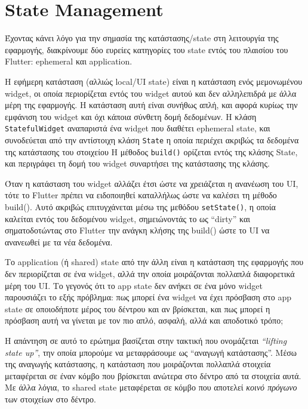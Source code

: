 \documentclass[../thesis.tex]{subfiles}
\begin{document}
\section{State Management}
Έχοντας κάνει λόγο για την σημασία της κατάστασης/state στη λειτουργία της εφαρμογής, διακρίνουμε δύο ευρείες κατηγορίες του state εντός του πλαισίου του Flutter: ephemeral και application\cite{flutter_state}.

Η εφήμερη κατάσταση (αλλιώς local/UI state) είναι η κατάσταση ενός μεμονωμένου widget, οι οποία περιορίζεται εντός του widget αυτού και δεν αλληλεπιδρά με άλλα μέρη της εφαρμογής.
Η κατάσταση αυτή είναι συνήθως απλή, και αφορά κυρίως την εμφάνιση του widget και όχι κάποια σύνθετη δομή δεδομένων.
Η κλάση \texttt{StatefulWidget} αναπαριστά ένα widget που διαθέτει ephemeral state, και συνοδεύεται από την αντίστοιχη κλάση \texttt{State} η οποία περιέχει ακριβώς τα δεδομένα της κατάστασης του στοιχείου
Η μέθοδος \texttt{build()} ορίζεται εντός της κλάσης State, και περιγράφει τη δομή του widget συναρτήσει της κατάστασης της κλάσης.

Όταν η κατάσταση του widget αλλάζει έτσι ώστε να χρειάζεται η ανανέωση του UI, τότε το Flutter πρέπει να ειδοποιηθεί καταλλήλως ώστε να καλέσει τη μέθοδο build().
Αυτό ακριβώς επιτυγχάνεται μέσω της μεθόδου \texttt{setState()}, η οποία καλείται εντός του δεδομένου widget, σημειώνοντάς το ως ``dirty'' και σηματοδοτώντας στο Flutter την ανάγκη κλήσης της build() ώστε το UI να ανανεωθεί με τα νέα δεδομένα.

\bigskip

Το application (ή shared) state από την άλλη είναι η κατάσταση της εφαρμογής που δεν περιορίζεται σε ένα widget, αλλά την οποία μοιράζονται πολλαπλά διαφορετικά μέρη του UI.
Το γεγονός ότι το app state δεν ανήκει σε ένα μόνο widget παρουσιάζει το εξής πρόβλημα: πως μπορεί ένα widget να έχει πρόσβαση στο app state σε οποιοδήποτε μέρος του δέντρου και αν βρίσκεται, και πως μπορεί η πρόσβαση αυτή να γίνεται με τον πιο απλό, ασφαλή, αλλά και αποδοτικό τρόπο;

\bigskip

Η απάντηση σε αυτό το ερώτημα βασίζεται στην τακτική που ονομάζεται \textit{``lifting state up''}, την οποία μπορούμε να μεταφράσουμε ως ``αναγωγή κατάστασης''.
Μέσω της αναγωγής κατάστασης, η κατάσταση που μοιράζονται πολλαπλά στοιχεία μεταφέρεται σε έναν κόμβο που βρίσκεται ανώτερα στο δέντρο από τα στοιχεία αυτά.
Με άλλα λόγια, το shared state μεταφέρεται σε κόμβο που αποτελεί \textit{κοινό πρόγωνο} των στοιχείων στο δέντρο.
\end{document}
